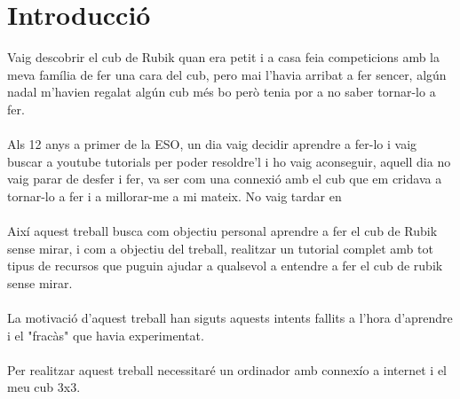 \part*{Introducció}

Vaig descobrir el cub de Rubik quan era petit i a casa feia competicions amb la meva família de fer una cara del cub, pero mai l'havia arribat a fer sencer, algún nadal m'havien regalat algún cub més bo però tenia por a no saber tornar-lo a fer.
\\\\Als 12 anys a primer de la ESO, un dia vaig decidir aprendre a fer-lo i vaig buscar a youtube tutorials per poder resoldre'l i ho vaig aconseguir, aquell dia no vaig parar de desfer i fer, va ser com una connexió amb el cub que em cridava a tornar-lo a fer i a millorar-me a mi mateix.
No vaig tardar en 
\\\\Així aquest treball busca com objectiu personal aprendre a fer el cub de Rubik sense mirar, i com a objectiu del treball, realitzar un tutorial complet amb tot tipus de recursos que puguin ajudar a qualsevol a entendre a fer el cub de rubik sense mirar.
\\\\La motivació d'aquest treball han siguts aquests intents fallits a l'hora d'aprendre i el "fracàs" que havia experimentat.
\\\\Per realitzar aquest treball necessitaré un ordinador amb connexío a internet i el meu cub 3x3.




